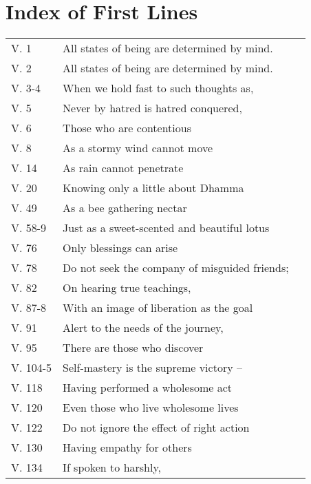 
\chapter{Index of First Lines}

{\smaller
\setlength{\parskip}{0pt}
\setlength{\parindent}{0pt}

\begin{longtable}[c]{llr}
V. 1 & All states of being are determined by mind. & \pageref{dhp-1}\\
V. 2 & All states of being are determined by mind. & \pageref{dhp-2}\\
V. 3-4 & When we hold fast to such thoughts as, & \pageref{dhp-3}\\
V. 5 & Never by hatred is hatred conquered, & \pageref{dhp-5}\\
V. 6 & Those who are contentious & \pageref{dhp-6}\\
V. 8 & As a stormy wind cannot move & \pageref{dhp-8}\\
V. 14 & As rain cannot penetrate & \pageref{dhp-14}\\
V. 20 & Knowing only a little about Dhamma & \pageref{dhp-20}\\
V. 49 & As a bee gathering nectar & \pageref{dhp-49}\\
V. 58-9 & Just as a sweet-scented and beautiful lotus & \pageref{dhp-58}\\
V. 76 & Only blessings can arise & \pageref{dhp-76}\\
V. 78 & Do not seek the company of misguided friends; & \pageref{dhp-78}\\
V. 82 & On hearing true teachings, & \pageref{dhp-82}\\
V. 87-8 & With an image of liberation as the goal & \pageref{dhp-87}\\
V. 91 & Alert to the needs of the journey, & \pageref{dhp-91}\\
V. 95 & There are those who discover & \pageref{dhp-95}\\
V. 104-5 & Self-mastery is the supreme victory -- & \pageref{dhp-104}\\
V. 118 & Having performed a wholesome act & \pageref{dhp-118}\\
V. 120 & Even those who live wholesome lives & \pageref{dhp-120}\\
V. 122 & Do not ignore the effect of right action & \pageref{dhp-122}\\
V. 130 & Having empathy for others & \pageref{dhp-130}\\
V. 134 & If spoken to harshly, & \pageref{dhp-134}\\

\end{longtable}}
